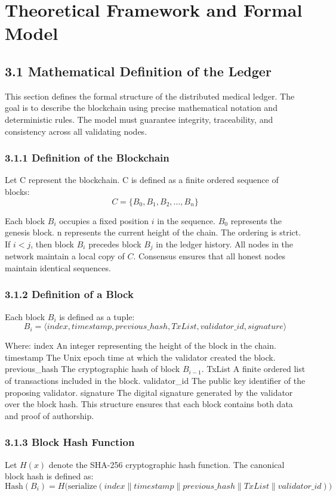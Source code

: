 \section*{Theoretical Framework and Formal Model}

\subsection*{3.1 Mathematical Definition of the Ledger}
This section defines the formal structure of the distributed medical ledger. The goal is to describe the blockchain using precise mathematical notation and deterministic rules. The model must guarantee integrity, traceability, and consistency across all validating nodes.

\subsubsection*{3.1.1 Definition of the Blockchain}
Let C represent the blockchain.
C is defined as a finite ordered sequence of blocks:
\[
C = \{ B_0, B_1, B_2, \dots, B_n \}
\]

Each block $B_i$ occupies a fixed position $i$ in the sequence.
$B_0$ represents the genesis block.
n represents the current height of the chain.
The ordering is strict.
If $i < j$, then block $B_i$ precedes block $B_j$ in the ledger history.
All nodes in the network maintain a local copy of $C$.
Consensus ensures that all honest nodes maintain identical sequences.

\subsubsection*{3.1.2 Definition of a Block}
Each block $B_i$ is defined as a tuple:
\[
B_i = \langle index, timestamp, previous\_hash, TxList, validator\_id, signature \rangle
\]

Where:
index
An integer representing the height of the block in the chain.
timestamp
The Unix epoch time at which the validator created the block.
previous_hash
The cryptographic hash of block $B_{i-1}$.
TxList
A finite ordered list of transactions included in the block.
validator_id
The public key identifier of the proposing validator.
signature
The digital signature generated by the validator over the block hash.
This structure ensures that each block contains both data and proof of authorship.

\subsubsection*{3.1.3 Block Hash Function}
Let $H(x)$ denote the SHA-256 cryptographic hash function.
The canonical block hash is defined as:
\[
\mathrm{Hash}(B_i) =
H\big(\mathrm{serialize}(index \parallel timestamp \parallel previous\_hash \parallel TxList \parallel validator\_id)\big)
\]

